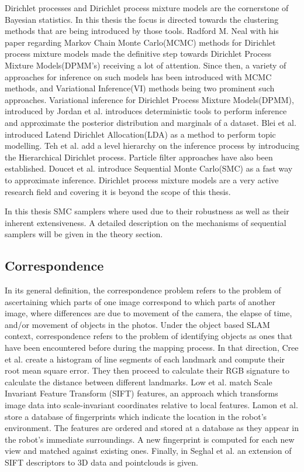 \documentclass[twoside,hidelinks]{article}
\begin{document}
Dirichlet processes and Dirichlet process mixture models are the cornerstone of Bayesian statistics. In this thesis the focus is directed towards the clustering methods that are being introduced by those tools. Radford M. Neal\cite{bayes:neal} with his paper regarding Markov Chain Monte Carlo(MCMC) methods for Dirichlet process mixture models made the definitive step towards Dirichlet Process Mixture Models(DPMM's) receiving a lot of attention. Since then, a variety of approaches for inference on such models has been introduced with MCMC methods, and Variational Inference(VI) methods being two prominent such approaches. Variational inference for Dirichlet Process Mixture Models(DPMM), introduced by Jordan et al.\cite{bayes:jordan} introduces deterministic tools to perform inference and approximate the posterior distribution and marginals of a dataset. Blei et al.\cite{LDA} introduced Latend Dirichlet Allocation(LDA) as a method to perform topic modelling. Teh et al.\cite{bayes:hier} add a level hierarchy on the inference process by introducing the Hierarchical Dirichlet process. Particle filter approaches have also been established. Doucet et al.\cite{bayes:smc} introduce Sequential Monte Carlo(SMC) as a fast way to approximate inference. Dirichlet process mixture models are a very active research field and covering it is beyond the scope of this thesis. 

In this thesis SMC samplers where used due to their robustness as well as their inherent extensiveness. A detailed description on the mechanisms of sequential samplers will be given in the theory section.

\subsection{Correspondence}

In its general definition, the correspondence problem refers to the problem of ascertaining which parts of one image correspond to which parts of another image, where differences are due to movement of the camera, the elapse of time, and/or movement of objects in the photos. Under the object based SLAM context, correspondence refers to the problem of identifying objects as ones that have been encountered before during the mapping process. In that direction, Cree et al.\cite{corresp:first} create a histogram of line segments of each landmark and compute their root mean square error. They then proceed to calculate their RGB signature to calculate the distance between different landmarks. Low et al.\cite{corres:sec} match Scale Invariant Feature Transform (SIFT) features, an approach which transforms image data into scale-invariant coordinates relative to local features. Lamon et al.\cite{corres:three} store a database of fingerprints which indicate the location in the robot's environment. The features are ordered and stored at a database as they appear in the robot's immediate surroundings. A new fingerprint is computed for each new view and matched against existing ones. Finally, in Seghal et al.\cite{corres:four} an extension of SIFT descriptors to 3D data and pointclouds is given. 
\end{document}
